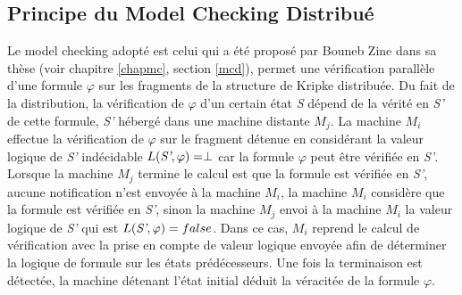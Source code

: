 
\subsection{Principe du Model Checking Distribu\'{e}}
 
Le model checking adopté est celui qui a été  propos\'{e} par Bouneb Zine dans sa thèse \citep{depriester2011bouneb} (voir chapitre \ref{chapmc}, section \ref{mcd}), permet une vérification parallèle d’une formule $\varphi$  sur les fragments de la structure de Kripke distribuée. Du fait de la distribution, la vérification de $\varphi$ d'un certain état \emph{S} dépend de la vérité en \emph{S’} de cette formule, \emph{S’}  hébergé dans une  machine distante $M_j$. La machine $M_i$ effectue la vérification de $\varphi$ sur le fragment détenue en considérant la valeur logique de \emph{S’} indécidable  $L (\emph{S’},\varphi )=\perp$ car la formule $\varphi$ peut être vérifiée en \emph{S’}. Lorsque la machine $M_j$ termine le calcul est que la formule est vérifiée en \emph{S’}, aucune notification n'est envoyée à la machine $M_i$, la machine $M_i$ considère que la formule est vérifiée en \emph{S’}, sinon la machine $M_j$ envoi à la machine $M_i$ la valeur logique de \emph{S’} qui est $L(\emph{S’}, \varphi) =false$. Dans ce cas, $M_i$ reprend le calcul de vérification avec la prise en compte de valeur logique envoyée afin de déterminer la logique de formule sur les états prédécesseurs. Une fois la terminaison est détectée, la machine détenant l’état initial déduit la véracitée de la formule $\varphi$.


